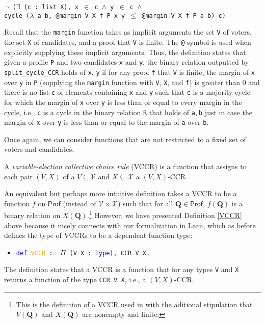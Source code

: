 \documentclass[runningheads]{llncs}
\begin{document}
\begin{example}
\begin{itemize}
    \texttt{$\neg$ ($\exists$ (c : list X), x $\in$ c $\wedge$ y $\in$ c $\wedge$}\\
    \texttt{cycle ($\lambda$ a b, @margin V X f P x y $\leq$ @margin V X f P a b) c)}
\end{itemize}
Recall that the \texttt{margin} function takes as implicit arguments the set \texttt{V} of voters, the set \texttt{X} of candidates, and a proof that \texttt{V} is finite. The \texttt{@} symbol is used when explicitly supplying these implicit arguments. Thus, the definition states that given a profile \texttt{P} and two candidates \texttt{x} and \texttt{y}, the binary relation outputted by \texttt{split\_cycle\_CCR} holds of \texttt{x}, \texttt{y} if for any proof \texttt{f} that \texttt{V} is finite, the margin of \texttt{x} over \texttt{y} in \texttt{P} (supplying the \texttt{margin} function with \texttt{V}, \texttt{X}, and \texttt{f}) is greater than 0 and there is no list \texttt{c} of elements containing \texttt{x} and \texttt{y} such that \texttt{c} is a majority cycle for which the margin of \texttt{x} over \texttt{y} is less than or equal to every margin in the cycle, i.e., \texttt{c} is a cycle in the binary relation \texttt{R} that holds of \texttt{a,b} just in case the margin of \texttt{x} over \texttt{y} is less than or equal to the margin of \texttt{a} over \texttt{b}.

\end{example}

Once again, we can consider functions that are not restricted to a fixed set of voters and candidates.

\begin{definition}\label{VCCR} \textnormal{A \emph{variable-election collective choice rule} (VCCR) is a function that assigns to each pair $(V,X)$ of a $V\subseteq\mathcal{V}$ and $X\subseteq\mathcal{X}$ a $(V,X)$-CCR.}%
\end{definition}

\noindent An equivalent but perhaps more intuitive definition takes a VCCR to be a function $f$ on $\mathsf{Prof}$ (instead of $\mathcal{V}\times\mathcal{X}$) such that for all $\mathbf{Q}\in\mathsf{Prof}$, $f(\mathbf{Q})$ is a binary relation on $X(\mathbf{Q})$.\footnote{This is the definition of a VCCR used in \cite{HP2020} with the aditional stipulation that $V(\mathbf{Q})$ and $X(\mathbf{Q})$ are nonempty and finite.} However, we have presented Definition \ref{VCCR} above because it nicely connects with our formalization in Lean, which as before defines the type of VCCRs to be a dependent function type:
\begin{itemize}
\item[] \texttt{\textcolor{blue}{def} \textcolor{orange}{VCCR} := $\Pi$ (V X : \textcolor{blue}{Type}), CCR V X.}
\end{itemize}
The definition states that a VCCR is a function that for any types \texttt{V} and \texttt{X} returns a function of the type \texttt{CCR V X}, i.e., a $(V,X)$-CCR.
\end{document}

